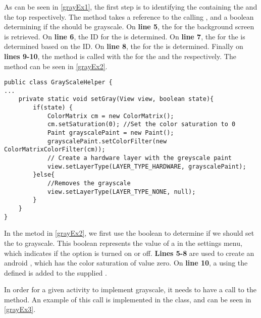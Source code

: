 As can be seen in \autoref{grayEx1}, the first step is to identifying the
 containing the  and the top 
respectively. The method  takes a reference to
the calling , and a boolean determining if the 
should be grayscale. On \textbf{line 5}, the  for the background
 screen is retrieved. On \textbf{line 6}, the ID for the
 is determined. On \textbf{line 7}, the  for the
 is determined based on the ID. On \textbf{line 8}, the
 for the  is determined. Finally on \textbf{lines 9-10}, the 
method is called with the  for the  and the
 respectively. The  method can be seen in
\autoref{grayEx2}.\nl

\begin{minipage}[H]{\linewidth}
\begin{lstlisting}[caption = Method used to change to color saturation of views., label = grayEx2]
public class GrayScaleHelper {
...
    private static void setGray(View view, boolean state){
        if(state) {
            ColorMatrix cm = new ColorMatrix();
            cm.setSaturation(0); //Set the color saturation to 0
            Paint grayscalePaint = new Paint();
            grayscalePaint.setColorFilter(new ColorMatrixColorFilter(cm));
            // Create a hardware layer with the greyscale paint
            view.setLayerType(LAYER_TYPE_HARDWARE, grayscalePaint);
        }else{
            //Removes the grayscale
            view.setLayerType(LAYER_TYPE_NONE, null);
        }
    }
}
\end{lstlisting}
\end{minipage}

In the  metod in \autoref{grayEx2}, we first use the boolean
 to determine if we should set the  to grayscale. This
boolean represents the value of a  in the settings menu,
which indicates if the option is turned on or off. \textbf{Lines 5-8} are used
to create an android , which has the color saturation of value
zero. On \textbf{line 10}, a  using the defined
 is added to the supplied .\nl

In order for a given activity to implement grayscale, it needs to have a call to
the  method. An example of this call is
implemented in the  class, and can be seen in
\autoref{grayEx3}.\nl

